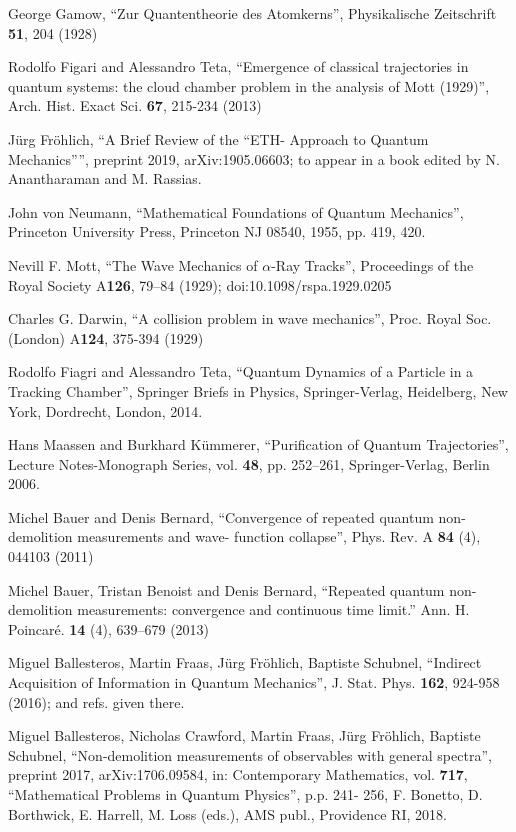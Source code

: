 \documentclass[11pt]{article}
\begin{document}
\begin{thebibliography}{References}

 George Gamow, ``Zur Quantentheorie des Atomkerns'', Physikalische Zeitschrift {\bf{51}}, 204 (1928)

 Rodolfo Figari and Alessandro Teta, ``Emergence of classical trajectories in quantum systems: the cloud chamber problem in the analysis of Mott (1929)'', Arch. Hist. Exact Sci. {\bf{67}}, 215-234 (2013)

 J\"urg Fr\"ohlich, ``A Brief Review of the ``ETH- Approach to Quantum Mechanics'''', preprint 2019,  	arXiv:1905.06603; to appear in a book edited by N. Anantharaman and M. Rassias.

 John von Neumann, ``Mathematical Foundations of Quantum Mechanics'', Princeton University Press, Princeton NJ 08540, 1955, pp. 419, 420.

 Nevill F. Mott, ``The Wave Mechanics of $\alpha$-Ray Tracks'', Proceedings of the Royal Society A{\bf{126}}, 79–84 (1929); doi:10.1098/rspa.1929.0205

 Charles G. Darwin, ``A collision problem in wave mechanics'', Proc. Royal Soc. (London) A{\bf{124}}, 375-394 (1929)

 Rodolfo Fiagri and Alessandro Teta, ``Quantum Dynamics of a Particle in a Tracking Chamber'', Springer Briefs in Physics, Springer-Verlag, Heidelberg, New York, Dordrecht, London, 2014.

 Hans Maassen and Burkhard K\"ummerer, ``Purification of Quantum Trajectories'', Lecture Notes-Monograph Series, vol. {\bf{48}}, pp. 252–261,  Springer-Verlag, Berlin 2006.

 Michel Bauer and Denis Bernard, ``Convergence of repeated quantum non-demolition measurements and wave-
function collapse'',  Phys. Rev. A {\bf{84}} (4), 044103 (2011)

 Michel Bauer, Tristan Benoist and Denis Bernard, ``Repeated quantum non-demolition measurements: convergence and continuous time limit.'' Ann. H. Poincaré. {\bf 14} (4), 639--679 (2013)

 Miguel Ballesteros, Martin Fraas, J\"urg Fr\"ohlich, Baptiste Schubnel, ``Indirect Acquisition of Information in Quantum Mechanics'', J. Stat. Phys. {\bf{162}}, 924-958 (2016); and refs. given there.

 Miguel Ballesteros, Nicholas Crawford, Martin Fraas, J\"urg Fr\"ohlich, Baptiste Schubnel, ``Non-demolition measurements of observables with general spectra'', preprint 2017, arXiv:1706.09584, in: Contemporary Mathematics, vol. {\bf{717}}, ``Mathematical Problems in Quantum Physics'', p.p. 241- 256, F. Bonetto, D. Borthwick, E. Harrell, M. Loss (eds.), AMS publ., Providence RI, 2018.


\end{thebibliography}
\end{document}
